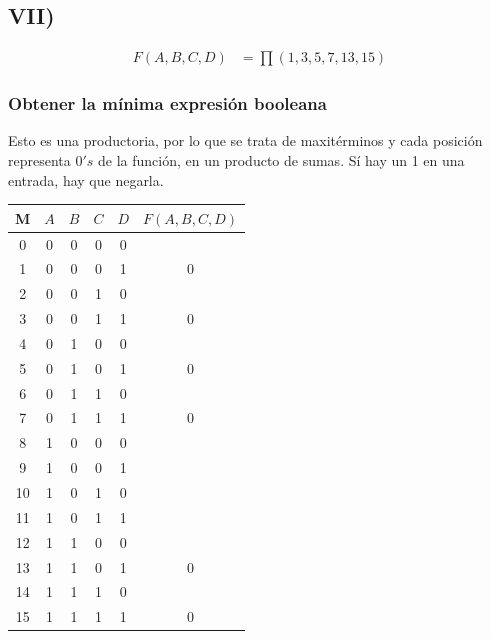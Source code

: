\subsection{VII)}

{\large\begin{align*}\displaystyle F(A, B, C, D) &= \prod(1, 3, 5, 7, 13, 15)\end{align*}}

\subsubsection{Obtener la mínima expresión booleana}
Esto es una productoria, por lo que se trata de maxitérminos y cada posición representa $0's$ de la función, en un producto de sumas. Sí hay un 1 en una entrada, hay que negarla.

\begin{center}
\begin{tabular}{c|cccc|c}
\rowcolor[HTML]{FFCCC9} 
\cellcolor[HTML]{9AFF99}M & $A$ & $B$ & $C$ & $D$ & \cellcolor[HTML]{FFFFC7}$F(A,B,C,D) $\\ \hline
0                         & 0   & 0   & 0   & 0   &                                  \\
1                         & 0   & 0   & 0   & 1   & 0                                \\
2                         & 0   & 0   & 1   & 0   &                                  \\
3                         & 0   & 0   & 1   & 1   & 0                                \\
4                         & 0   & 1   & 0   & 0   &                                  \\
5                         & 0   & 1   & 0   & 1   & 0                                \\
6                         & 0   & 1   & 1   & 0   &                                  \\
7                         & 0   & 1   & 1   & 1   & 0                                \\
8                         & 1   & 0   & 0   & 0   &                                  \\
9                         & 1   & 0   & 0   & 1   &                                  \\
10                        & 1   & 0   & 1   & 0   &                                  \\
11                        & 1   & 0   & 1   & 1   &                                  \\
12                        & 1   & 1   & 0   & 0   &                                  \\
13                        & 1   & 1   & 0   & 1   & 0                                \\
14                        & 1   & 1   & 1   & 0   &                                  \\
15                        & 1   & 1   & 1   & 1   & 0                               
\end{tabular}
\end{center}
